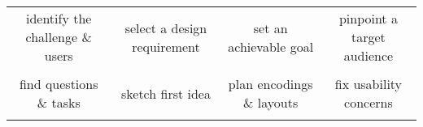 {\begin{spacing}{1.0}
\begin{longtable}[]{cccc}
\begin{minipage}[t]{0.21\columnwidth}
identify the challenge \& users\strut
\end{minipage} & \begin{minipage}[t]{0.21\columnwidth}\raggedright\strut
select a design requirement\strut
\end{minipage} & \begin{minipage}[t]{0.21\columnwidth}\raggedright\strut
set an achievable goal\strut
\end{minipage} & \begin{minipage}[t]{0.21\columnwidth}\raggedright\strut
pinpoint a target audience\strut
\end{minipage}\tabularnewline
\begin{minipage}[t]{0.21\columnwidth}\raggedright\strut
\strut
\end{minipage} & \begin{minipage}[t]{0.21\columnwidth}\raggedright\strut
\strut
\end{minipage} & \begin{minipage}[t]{0.21\columnwidth}\raggedright\strut
\strut
\end{minipage} & \begin{minipage}[t]{0.21\columnwidth}\raggedright\strut
\strut
\end{minipage}\tabularnewline
\begin{minipage}[t]{0.21\columnwidth}\raggedright\strut
find questions \& tasks\strut
\end{minipage} & \begin{minipage}[t]{0.21\columnwidth}\raggedright\strut
sketch first idea\strut
\end{minipage} & \begin{minipage}[t]{0.21\columnwidth}\raggedright\strut
plan encodings \& layouts\strut
\end{minipage} & \begin{minipage}[t]{0.21\columnwidth}\raggedright\strut
fix usability concerns\strut
\end{minipage}\tabularnewline
\begin{minipage}[t]{0.21\columnwidth}\raggedright\strut
\strut
\end{minipage} & \begin{minipage}[t]{0.21\columnwidth}\raggedright\strut
\strut
\end{minipage} & \begin{minipage}[t]{0.21\columnwidth}\raggedright\strut
\strut
\end{minipage} & \begin{minipage}[t]{0.21\columnwidth}\raggedright\strut

\end{minipage}
\end{longtable}
\end{spacing}}
